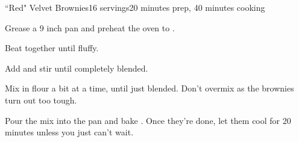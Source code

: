 \documentclass[../Cookbook.tex]{subfiles}
\begin{document}
\begin{recipe}{``Red" Velvet Brownies}{16 servings}{20 minutes prep, 40 minutes cooking}

Grease a 9 inch pan and preheat the oven to .

Beat together until fluffy.

Add and stir until completely blended.

Mix in flour a bit at a time, until just blended. Don't overmix as the brownies turn out too tough.

\newstep
Pour the mix into the pan and bake . Once they're done, let them cool for 20 minutes unless you just can't wait.

\end{recipe}
\end{document}
